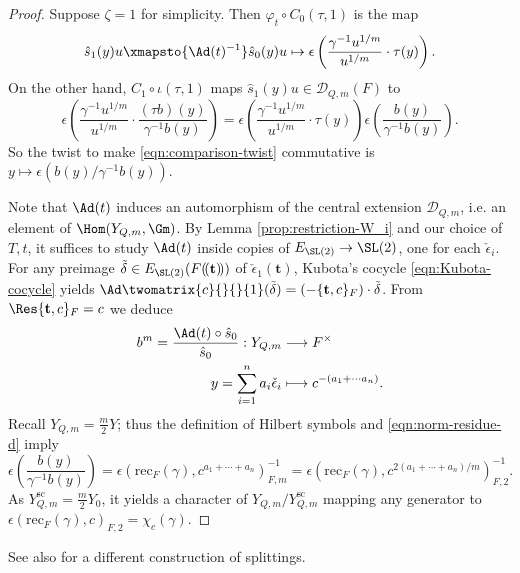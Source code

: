 \documentclass[a4paper,10pt]{article}
\begin{document}
\begin{proof}
	Suppose $\zeta=1$ for simplicity. Then $\varphi_t \circ C_0(\tau, 1)$ is the map
	\[ \hat{s}_1(y)u \xmapsto{\Ad(t)^{-1}} \hat{s}_0(y) u \mapsto \epsilon\left( \frac{\gamma^{-1} u^{1/m}}{u^{1/m}} \cdot \tau(y) \right). \]
	On the other hand, $C_1  \circ\iota(\tau, 1)$ maps $\hat{s}_1(y) u \in \mathcal{D}_{Q,m}(F)$ to
	\[ \epsilon\left( \frac{\gamma^{-1} u^{1/m}}{u^{1/m}} \cdot \frac{ (\tau b) (y)}{\gamma^{-1} b(y)} \right) = \epsilon\left( \frac{\gamma^{-1} u^{1/m}}{u^{1/m}} \cdot \tau(y) \right) \epsilon\left( \frac{b(y)}{\gamma^{-1} b(y)} \right). \]
	So the twist to make \eqref{eqn:comparison-twist} commutative is $y \mapsto \epsilon(b(y)/\gamma^{-1}b(y))$.

	Note that $\Ad(t)$ induces an automorphism of the central extension $\mathcal{D}_{Q,m}$, i.e. an element of $\Hom(Y_{Q,m}, \Gm)$. By Lemma \ref{prop:restriction-W_i} and our choice of $T, t$, it suffices to study $\Ad(t)$ inside copies of $E_{\SL(2)} \to \SL(2)$, one for each $\check{\epsilon}_i$. For any preimage $\tilde{\delta} \in E_{\SL(2)}(F(\!(\mathbf{t})\!))$ of $\check{\epsilon}_1(\mathbf{t})$, Kubota's cocycle \eqref{eqn:Kubota-cocycle} yields $\Ad\twomatrix{c}{}{}{1}(\tilde{\delta}) = (-\{\mathbf{t}, c\}_F) \cdot \tilde{\delta}$. From $\Res\{\mathbf{t}, c\}_F = c$ we deduce
	\begin{align*}
		b^m = \frac{\Ad(t) \circ \hat{s}_0}{\hat{s}_0}: Y_{Q,m} & \longrightarrow F^\times \\
		y = \sum_{i=1}^n a_i \check{\epsilon}_i & \longmapsto c^{-(a_1 + \cdots a_n)}.
	\end{align*}
	Recall $Y_{Q,m} = \frac{m}{2}Y$; thus the definition of Hilbert symbols and \eqref{eqn:norm-residue-d} imply
	\[ \epsilon\left( \frac{b(y)}{\gamma^{-1}b(y)}\right) = \epsilon \left( \text{rec}_F(\gamma), c^{a_1 + \cdots + a_n} \right)_{F, m}^{-1} = \epsilon\left( \text{rec}_F(\gamma), c^{2(a_1 + \cdots + a_n)/m} \right)_{F,2}^{-1}. \]
	As $Y_{Q,m}^\text{sc} = \frac{m}{2} Y_0$, it yields a character of $Y_{Q,m}/Y_{Q,m}^\text{sc}$ mapping any generator to $\epsilon(\text{rec}_F(\gamma), c)_{F,2} = \chi_c(\gamma)$.
\end{proof}

See also \cite[\S 7]{GG} for a different construction of splittings.
\end{document}
